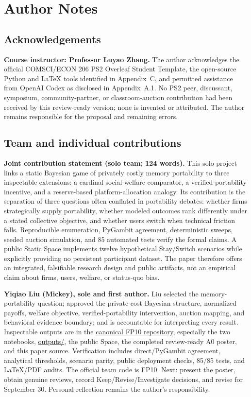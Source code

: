 \clearpage\nobalance
\section*{Author Notes}
\subsection*{Acknowledgements}
\textbf{Course instructor: Professor Luyao Zhang.} The author acknowledges the official COMSCI/ECON 206 PS2 Overleaf Student Template, the open-source Python and LaTeX tools identified in Appendix~C, and permitted assistance from OpenAI Codex as disclosed in Appendix~A.1. No PS2 peer, discussant, symposium, community-partner, or classroom-auction contribution had been received by this review-ready version; none is invented or attributed. The author remains responsible for the proposal and remaining errors.

\subsection*{Team and individual contributions}
\textbf{Joint contribution statement (solo team; 124 words).} This solo project links a static Bayesian game of privately costly memory portability to three inspectable extensions: a cardinal social-welfare comparator, a verified-portability incentive, and a reserve-based platform-allocation analogy. Its contribution is the separation of three questions often conflated in portability debates: whether firms strategically supply portability, whether modeled outcomes rank differently under a stated collective objective, and whether users switch when technical friction falls. Reproducible enumeration, PyGambit agreement, deterministic sweeps, seeded auction simulation, and 85 automated tests verify the formal claims. A public Static Space implements twelve hypothetical Stay/Switch scenarios while explicitly providing no persistent participant dataset. The paper therefore offers an integrated, falsifiable research design and public artifacts, not an empirical claim about firms, users, welfare, or status-quo bias.

\textbf{Yiqiao Liu (Mickey), sole and first author.} Liu selected the memory-portability question; approved the private-cost Bayesian structure, normalized payoffs, welfare objective, verified-portability intervention, auction mapping, and behavioral evidence boundary; and is accountable for interpreting every result. Inspectable outputs are in the \href{https://github.com/dku-comsci-econ206-Autumn2026/FP10-StayOrSwitch-Yiqiao}{canonical FP10 repository}, especially the two notebooks, \url{outputs/}, the public Space, the completed review-ready A0 poster, and this paper source. Verification includes direct/PyGambit agreement, analytical thresholds, scenario parity, public deployment checks, 85/85 tests, and LaTeX/PDF audits. The official team code is FP10. Next: present the poster, obtain genuine reviews, record Keep/Revise/Investigate decisions, and revise for September 30. Personal reflection remains the author's responsibility.

